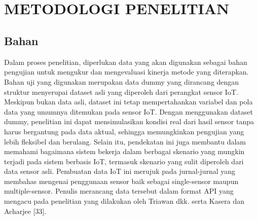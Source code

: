 \chapter[METODOLOGI PENELITIAN]{\\ METODOLOGI PENELITIAN}
\section{Bahan}
Dalam proses penelitian, diperlukan data yang akan digunakan sebagai bahan pengujian untuk mengukur dan mengevaluasi kinerja metode yang diterapkan. Bahan uji yang digunakan merupakan data dummy yang dirancang dengan struktur menyerupai dataset asli yang diperoleh dari perangkat sensor IoT. Meskipun bukan data asli, dataset ini tetap mempertahankan variabel dan pola data yang umumnya ditemukan pada sensor IoT. Dengan menggunakan dataset dummy, penelitian ini dapat mensimulasikan kondisi real dari hasil sensor tanpa harus bergantung pada data aktual, sehingga memungkinkan pengujian yang lebih fleksibel dan berulang. Selain itu, pendekatan ini juga membantu dalam memahami bagaimana sistem bekerja dalam berbagai skenario yang mungkin terjadi pada sistem berbasis IoT, termasuk skenario yang sulit diperoleh dari data sensor asli. Pembuatan data IoT ini merujuk pada jurnal-jurnal yang membahas mengenai penggunaan sensor baik sebagai single-sensor maupun multiple-sensor. Penulis merancang data tersebut dalam format API yang mengacu pada penelitian yang dilakukan oleh Triawan dkk. \cite{Triawan2023} serta Kasera dan Acharjee [33]. 

